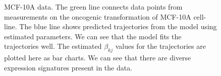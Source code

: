 \begin{figure}
  \centering
  \caption{MCF-10A data.  The green line connects data points from measurements on the oncogenic transformation of MCF-10A cell-line. The blue line shows predicted trajectories from the model using estimated parameters. We can see that the model fits the trajectories well.  The estimated $\beta_{kj}$ values for the trajectories are plotted here as bar charts. We can see that there are diverse expression signatures present in the data.}
  \label{fig:data-fit-traj}
\end{figure}

